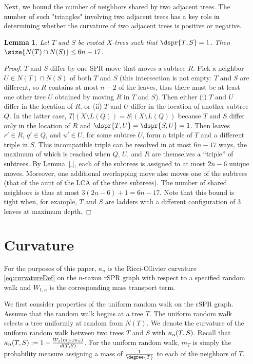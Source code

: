 \documentclass{amsart}
\newtheorem{lemma}[theorem]{Lemma}
\newcommand{\curvature}[2][]{%
    \ifthenelse{\equal{#1}{}}%
		{\kappa_n(#2)}%
		{\kappa_n(#1;#2)}%
}
\begin{document}
Next, we bound the number of neighbors shared by two adjacent trees.
The number of such "triangles" involving two adjacent trees has a key role in determining whether the curvature of two adjacent trees is positive or negative.

\begin{lemma}
	\label{lem:shared_neighbors}
Let $T$ and $S$ be rooted $X$-trees such that $\dspr{T,S} = 1$.
Then $\size{N(T) \cap N(S)} \le 6n - 17$.
\end{lemma}

\begin{proof}
	$T$ and $S$ differ by one SPR move that moves a subtree $R$.
	Pick a neighbor $U \in N(T) \cap N(S)$ of both $T$ and $S$ (this intersection is not empty: $T$ and $S$ are different, so $R$ contains at most $n-2$ of the leaves, thus there must be at least one other tree $U$ obtained by moving $R$ in $T$ and $S$).
	Then either (i) $T$ and $U$ differ in the location of $R$, or (ii) $T$ and $U$ differ in the location of another subtree $Q$.
	In the latter case, $T|(X \setminus L(Q)) = S|(X \setminus L(Q))$ because $T$ and $S$ differ only in the location of $R$ and $\dspr{T,U} = \dspr{S,U} = 1$.
	Then leaves $r' \in R$, $q' \in Q$, and $u' \in U$, for some subtree $U$, form a triple of $T$ and a different triple in $S$.
	This incompatible triple can be resolved in at most $6n - 17$ ways, the maximum of which is reached when $Q$, $U$, and $R$ are themselves a ``triple'' of subtrees.
	By Lemma~\ref{ }, each of the subtrees is assigned to at most $2n-6$ unique moves.
	Moreover, one additional overlapping move also moves one of the subtrees (that of the aunt of the LCA of the three subtrees).
	The number of shared neighbors is thus at most $3(2n-6) + 1 = 6n-17$.
	Note that this bound is tight when, for example, $T$ and $S$ are ladders with a different configuration of 3 leaves at maximum depth.
\end{proof}





\section{Curvature}
For the purposes of this paper, $\kappa_n$ is the Ricci-Ollivier curvature \eqref{eq:curvatureDef} on the $n$-taxon rSPR graph with respect to a specified random walk and $W_{1,n}$ is the corresponding mass transport term.

We first consider properties of the uniform random walk on the rSPR graph.
Assume that the random walk begins at a tree $T$.
The uniform random walk selects a tree uniformly at random from $N(T)$.
We denote the curvature of the uniform random walk between two trees $T$ and $S$ with $\curvature{T,S}$.
Recall that $\curvature{T, S} := 1 - \frac{W_1(m_T, m_S)}{d(T, S)}$.
For the uniform random walk, $m_T$ is simply the probability measure assigning a mass of $\frac{1}{\degree{T}}$ to each of the neighbors of $T$.
\end{document}
